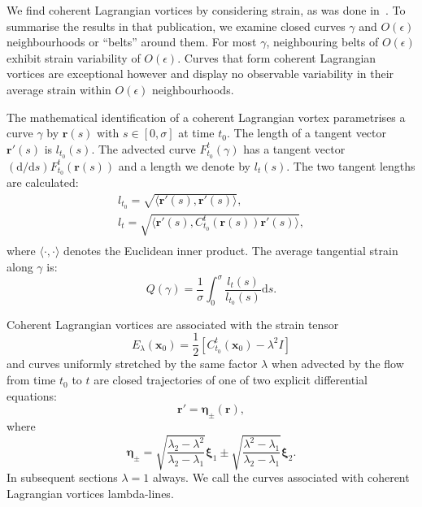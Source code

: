 \documentclass{article}
\begin{document}
We find coherent Lagrangian vortices by considering strain, as was done in~\textcite{haller13:_coher_lagran}. To summarise the results in that publication, we examine closed curves $\gamma$ and $O(\epsilon)$ neighbourhoods or ``belts'' around them. For most $\gamma$, neighbouring belts of $O(\epsilon)$ exhibit strain variability of $O(\epsilon)$. Curves that form coherent Lagrangian vortices are exceptional however and display no observable variability in their average strain within $O(\epsilon)$ neighbourhoods.

The mathematical identification of a coherent Lagrangian vortex para\-metrises a curve $\gamma$ by $\boldsymbol r(s)$ with $s \in [0,\sigma]$ at time $t_0$. The length of a tangent vector $\boldsymbol r'(s)$ is $l_{t_0}(s)$. The advected curve $F_{t_0}^t(\gamma)$ has a tangent vector $(\text{d}/\text{d}s) F_{t_0}^t(\boldsymbol r(s))$ and a length we denote by $l_t(s)$. The two tangent lengths are calculated:
\begin{gather*}
l_{t_0} = \sqrt{\langle \boldsymbol r'(s), \boldsymbol r'(s) \rangle},\\
l_t = \sqrt{\langle \boldsymbol r'(s), C_{t_0}^t(\boldsymbol r(s)) \boldsymbol r'(s) \rangle},\\
\end{gather*}
where $\langle \cdot, \cdot \rangle$ denotes the Euclidean inner product.
The average tangential strain along $\gamma$ is:
\[
Q(\gamma) = \frac{1}{\sigma} \int_0^\sigma \frac{l_t(s)}{l_{t_0}(s)}\text{d}s.
\]

Coherent Lagrangian vortices are associated with the strain tensor
\[
E_\lambda(\boldsymbol x_0) = \frac12 [C_{t_0}^t(\boldsymbol x_0) - \lambda^2 I]
\]
and curves uniformly stretched by the same factor $\lambda$ when advected by the flow from time $t_0$ to $t$ are closed trajectories of one of two explicit 
differential equations: 
\begin{equation}
\boldsymbol r' = \boldsymbol \eta_\pm(\boldsymbol r),
\label{eq:etafields}
\end{equation}
where
\begin{equation}
\boldsymbol \eta_\pm = \sqrt{\frac{\lambda_2 - \lambda^2}{\lambda_2 - \lambda_1}} \boldsymbol \xi_1 \pm \sqrt{\frac{\lambda^2 - \lambda_1}{\lambda_2 
- \lambda_1}} \boldsymbol \xi_2.
\label{eq:eta}
\end{equation}
In subsequent sections $\lambda = 1$ always. We call the curves associated with coherent Lagrangian vortices lambda-lines.
\end{document}
